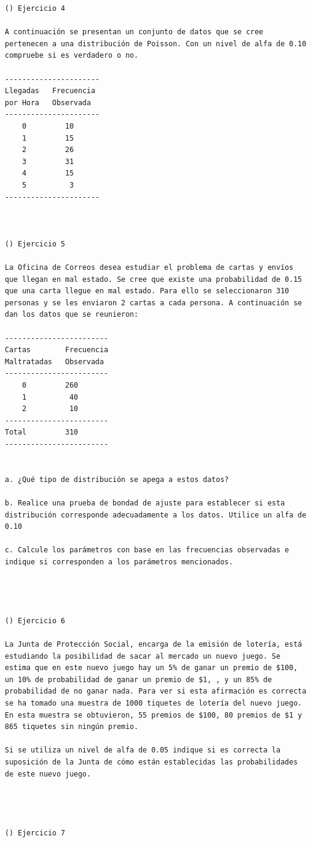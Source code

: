 \begin{verbatim}
() Ejercicio 4

A continuación se presentan un conjunto de datos que se cree pertenecen a una distribución de Poisson. Con un nivel de alfa de 0.10 compruebe si es verdadero o no.

----------------------
Llegadas   Frecuencia
por Hora   Observada
----------------------
    0         10
    1         15
    2         26
    3         31
    4         15
    5          3
----------------------



() Ejercicio 5

La Oficina de Correos desea estudiar el problema de cartas y envíos que llegan en mal estado. Se cree que existe una probabilidad de 0.15 que una carta llegue en mal estado. Para ello se seleccionaron 310 personas y se les enviaron 2 cartas a cada persona. A continuación se dan los datos que se reunieron:

------------------------
Cartas        Frecuencia
Maltratadas   Observada
------------------------
    0         260
    1          40
    2          10
------------------------
Total         310
------------------------


a. ¿Qué tipo de distribución se apega a estos datos?

b. Realice una prueba de bondad de ajuste para establecer si esta distribución corresponde adecuadamente a los datos. Utilice un alfa de 0.10

c. Calcule los parámetros con base en las frecuencias observadas e indique si corresponden a los parámetros mencionados.




() Ejercicio 6

La Junta de Protección Social, encarga de la emisión de lotería, está estudiando la posibilidad de sacar al mercado un nuevo juego. Se estima que en este nuevo juego hay un 5% de ganar un premio de $100, un 10% de probabilidad de ganar un premio de $1, , y un 85% de probabilidad de no ganar nada. Para ver si esta afirmación es correcta se ha tomado una muestra de 1000 tiquetes de lotería del nuevo juego. En esta muestra se obtuvieron, 55 premios de $100, 80 premios de $1 y 865 tiquetes sin ningún premio.

Si se utiliza un nivel de alfa de 0.05 indique si es correcta la suposición de la Junta de cómo están establecidas las probabilidades de este nuevo juego.




() Ejercicio 7


\end{verbatim}
